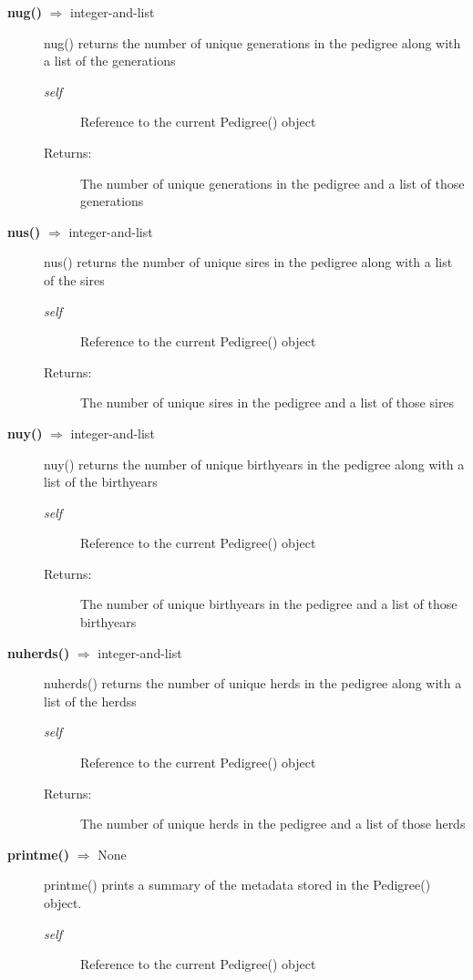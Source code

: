 \begin{description}
\item[\textbf{nug()} $\Rightarrow$ integer-and-list]
nug() returns the number of unique generations in the pedigree along with a list of the generations
\begin{description}
\item[\emph{self}] Reference to the current Pedigree() object
\item[Returns:] The number of unique generations in the pedigree and a list of those generations
\end{description}

\item[\textbf{nus()} $\Rightarrow$ integer-and-list]
nus() returns the number of unique sires in the pedigree along with a list of the sires
\begin{description}
\item[\emph{self}] Reference to the current Pedigree() object
\item[Returns:] The number of unique sires in the pedigree and a list of those sires
\end{description}

\item[\textbf{nuy()} $\Rightarrow$ integer-and-list]
nuy() returns the number of unique birthyears in the pedigree along with a list of the birthyears
\begin{description}
\item[\emph{self}] Reference to the current Pedigree() object
\item[Returns:] The number of unique birthyears in the pedigree and a list of those birthyears
\end{description}

\item[\textbf{nuherds()} $\Rightarrow$ integer-and-list]
nuherds() returns the number of unique herds in the pedigree along with a list of the herdss
\begin{description}
\item[\emph{self}] Reference to the current Pedigree() object
\item[Returns:] The number of unique herds in the pedigree and a list of those herds
\end{description}

\item[\textbf{printme()} $\Rightarrow$ None]
printme() prints a summary of the metadata stored in the Pedigree() object.
\begin{description}
\item[\emph{self}] Reference to the current Pedigree() object
\end{description}


\end{description}
